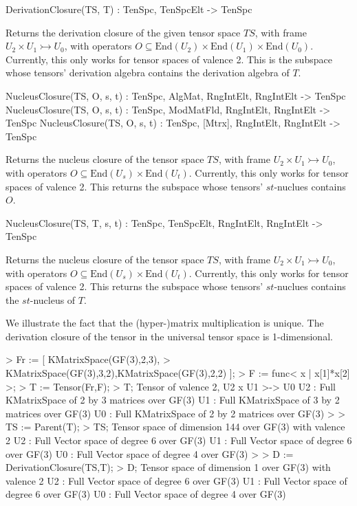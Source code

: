 \begin{intrinsics}
DerivationClosure(TS, T) : TenSpc, TenSpcElt -> TenSpc
\end{intrinsics}

Returns the derivation closure of the given tensor space $TS$, with frame $U_2\times U_1\rightarrowtail U_0$, with operators $O\subseteq \text{End}(U_2)\times \text{End}(U_1)\times \text{End}(U_0)$.
Currently, this only works for tensor spaces of valence 2.
This is the subspace whose tensors' derivation algebra contains the derivation algebra of $T$.

\begin{intrinsics}
NucleusClosure(TS, O, s, t) : TenSpc, AlgMat, RngIntElt, RngIntElt -> TenSpc
NucleusClosure(TS, O, s, t) : TenSpc, ModMatFld, RngIntElt, RngIntElt -> TenSpc
NucleusClosure(TS, O, s, t) : TenSpc, [Mtrx], RngIntElt, RngIntElt -> TenSpc
\end{intrinsics}

Returns the nucleus closure of the tensor space $TS$, with frame $U_2\times U_1\rightarrowtail U_0$, with operators $O\subseteq \text{End}(U_s)\times \text{End}(U_t)$.
Currently, this only works for tensor spaces of valence 2.
This returns the subspace whose tensors' $st$-nuclues contains $O$.

\begin{intrinsics}
NucleusClosure(TS, T, s, t) : TenSpc, TenSpcElt, RngIntElt, RngIntElt -> TenSpc
\end{intrinsics}

Returns the nucleus closure of the tensor space $TS$, with frame $U_2\times U_1\rightarrowtail U_0$, with operators $O\subseteq \text{End}(U_s)\times \text{End}(U_t)$.
Currently, this only works for tensor spaces of valence 2.
This returns the subspace whose tensors' $st$-nuclues contains the $st$-nucleus of $T$.

\begin{example}
We illustrate the fact that the (hyper-)matrix multiplication is unique. 
The derivation closure of the tensor in the universal tensor space is 1-dimensional.

\begin{code}
> Fr := [ KMatrixSpace(GF(3),2,3),
>   KMatrixSpace(GF(3),3,2),KMatrixSpace(GF(3),2,2) ];
> F := func< x | x[1]*x[2] >;
> T := Tensor(Fr,F);
> T;
Tensor of valence 2, U2 x U1 >-> U0
U2 : Full KMatrixSpace of 2 by 3 matrices over GF(3)
U1 : Full KMatrixSpace of 3 by 2 matrices over GF(3)
U0 : Full KMatrixSpace of 2 by 2 matrices over GF(3)
> 
> TS := Parent(T);
> TS;
Tensor space of dimension 144 over GF(3) with valence 2
U2 : Full Vector space of degree 6 over GF(3)
U1 : Full Vector space of degree 6 over GF(3)
U0 : Full Vector space of degree 4 over GF(3)
> 
> D := DerivationClosure(TS,T);
> D;
Tensor space of dimension 1 over GF(3) with valence 2
U2 : Full Vector space of degree 6 over GF(3)
U1 : Full Vector space of degree 6 over GF(3)
U0 : Full Vector space of degree 4 over GF(3)
\end{code}
\end{example}

